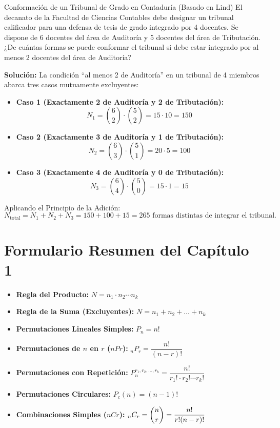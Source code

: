 \begin{ejemplo}{Conformación de un Tribunal de Grado en Contaduría (Basado en Lind)}
El decanato de la Facultad de Ciencias Contables debe designar un tribunal calificador para una defensa de tesis de grado integrado por 4 docentes. Se dispone de 6 docentes del área de Auditoría y 5 docentes del área de Tributación. ¿De cuántas formas se puede conformar el tribunal si debe estar integrado por al menos 2 docentes del área de Auditoría?

\tcbline
\textbf{Solución:}
La condición ``al menos 2 de Auditoría'' en un tribunal de 4 miembros abarca tres casos mutuamente excluyentes:
\begin{itemize}
    \item \textbf{Caso 1 (Exactamente 2 de Auditoría y 2 de Tributación):}
    \[
    N_1 = \binom{6}{2} \cdot \binom{5}{2} = 15 \cdot 10 = 150
    \]
    \item \textbf{Caso 2 (Exactamente 3 de Auditoría y 1 de Tributación):}
    \[
    N_2 = \binom{6}{3} \cdot \binom{5}{1} = 20 \cdot 5 = 100
    \]
    \item \textbf{Caso 3 (Exactamente 4 de Auditoría y 0 de Tributación):}
    \[
    N_3 = \binom{6}{4} \cdot \binom{5}{0} = 15 \cdot 1 = 15
    \]
\end{itemize}
Aplicando el Principio de la Adición:
\[
N_{\text{total}} = N_1 + N_2 + N_3 = 150 + 100 + 15 = 265 \text{ formas distintas de integrar el tribunal.}
\]
\end{ejemplo}

\section{Formulario Resumen del Capítulo 1}
\begin{formulario}
\begin{itemize}
    \item \textbf{Regla del Producto:} $N = n_1 \cdot n_2 \dotsm n_k$
    \item \textbf{Regla de la Suma (Excluyentes):} $N = n_1 + n_2 + \dots + n_k$
    \item \textbf{Permutaciones Lineales Simples:} $P_n = n!$
    \item \textbf{Permutaciones de $n$ en $r$ ($nPr$):} ${}_n P_r = \dfrac{n!}{(n-r)!}$
    \item \textbf{Permutaciones con Repetición:} $P_n^{r_1, r_2, \dots, r_k} = \dfrac{n!}{r_1! \cdot r_2! \dotsm r_k!}$
    \item \textbf{Permutaciones Circulares:} $P_c(n) = (n-1)!$
    \item \textbf{Combinaciones Simples ($nCr$):} ${}_n C_r = \dbinom{n}{r} = \dfrac{n!}{r!(n-r)!}$
\end{itemize}
\end{formulario}

